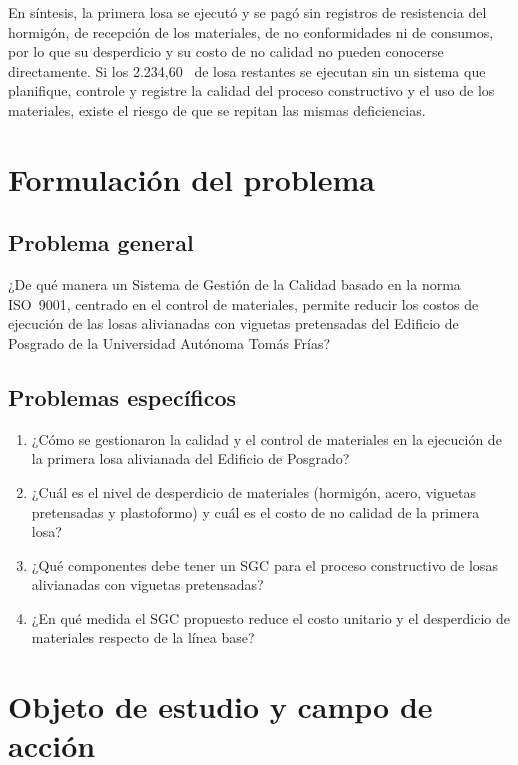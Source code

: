 En síntesis, la primera losa se ejecutó y se pagó sin registros de resistencia del hormigón, de recepción de los materiales, de no conformidades ni de consumos, por lo que su desperdicio y su costo de no calidad no pueden conocerse directamente. Si los 2.234,60~\mdos{} de losa restantes se ejecutan sin un sistema que planifique, controle y registre la calidad del proceso constructivo y el uso de los materiales, existe el riesgo de que se repitan las mismas deficiencias.

\section{Formulación del problema}

\subsection{Problema general}
¿De qué manera un Sistema de Gestión de la Calidad basado en la norma ISO~9001, centrado en el control de materiales, permite reducir los costos de ejecución de las losas alivianadas con viguetas pretensadas del Edificio de Posgrado de la Universidad Autónoma Tomás Frías?

\subsection{Problemas específicos}
\begin{enumerate}[label=\textbf{PE\arabic*.}]
  \item ¿Cómo se gestionaron la calidad y el control de materiales en la ejecución de la primera losa alivianada del Edificio de Posgrado?
  \item ¿Cuál es el nivel de desperdicio de materiales (hormigón, acero, viguetas pretensadas y plastoformo) y cuál es el costo de no calidad de la primera losa?
  \item ¿Qué componentes debe tener un SGC para el proceso constructivo de losas alivianadas con viguetas pretensadas?
  \item ¿En qué medida el SGC propuesto reduce el costo unitario y el desperdicio de materiales respecto de la línea base?
\end{enumerate}

\section{Objeto de estudio y campo de acción}

